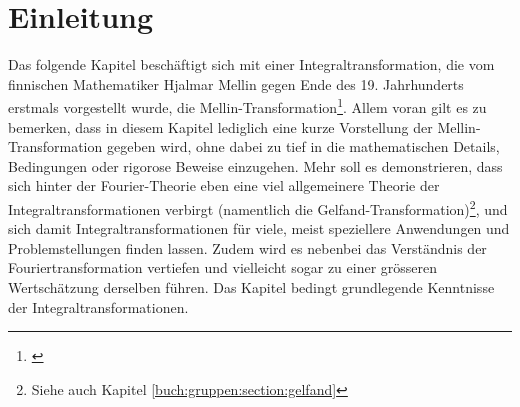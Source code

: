 %
%
%

\section{Einleitung\label{mellin:section:teil0}}

Das folgende Kapitel beschäftigt sich mit einer Integraltransformation, die vom finnischen Mathematiker Hjalmar 
Mellin gegen Ende des 19. Jahrhunderts erstmals vorgestellt wurde, die Mellin-Transformation\footnote{\cite{mellin:mellin-wikipedia}}.
Allem voran gilt es zu bemerken, dass in diesem Kapitel lediglich eine kurze Vorstellung der Mellin-Transformation 
gegeben wird, ohne dabei zu tief in die mathematischen Details, Bedingungen oder rigorose Beweise einzugehen.
Mehr soll es demonstrieren, dass sich hinter der Fourier-Theorie eben eine viel allgemeinere Theorie der Integraltransformationen 
verbirgt (namentlich die Gelfand-Transformation)\footnote{Siehe auch Kapitel \ref{buch:gruppen:section:gelfand}}, und sich damit 
Integraltransformationen für viele, meist speziellere Anwendungen und Problemstellungen finden lassen.
Zudem wird es nebenbei das Verständnis der Fouriertransformation vertiefen und vielleicht sogar zu einer grösseren Wertschätzung derselben führen.
Das Kapitel bedingt grundlegende Kenntnisse der Integraltransformationen.








